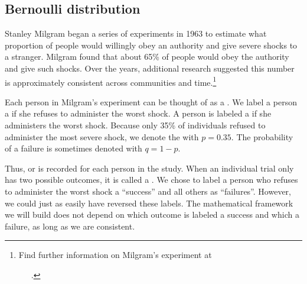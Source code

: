\subsection{Bernoulli distribution}
\label{bernoulli}


Stanley Milgram began a series of experiments in 1963 to estimate what proportion of people would willingly obey an authority and give severe shocks to a stranger. Milgram found that about 65\% of people would obey the authority and give such shocks. Over the years, additional research suggested this number is approximately consistent across communities and time.\footnote{Find further information on Milgram's experiment at \par \ \ \hspace{0.2mm}\ .}

Each person in Milgram's experiment can be thought of as a . We label a person a  if she refuses to administer the worst shock. A person is labeled a  if she administers the worst shock. Because only 35\% of individuals refused to administer the most severe shock, we denote the  with $p=0.35$. The probability of a failure is sometimes denoted with $q=1-p$.

Thus,  or  is recorded for
each person in the study.
When an individual trial only has two possible outcomes,
it is called a
.
We chose to label a person who refuses to administer the
worst shock a ``success'' and all others as ``failures''.
However, we could just as easily have reversed these labels.
The mathematical framework we will build does not depend
on which outcome is labeled a success and which a failure,
as long as we are consistent.

